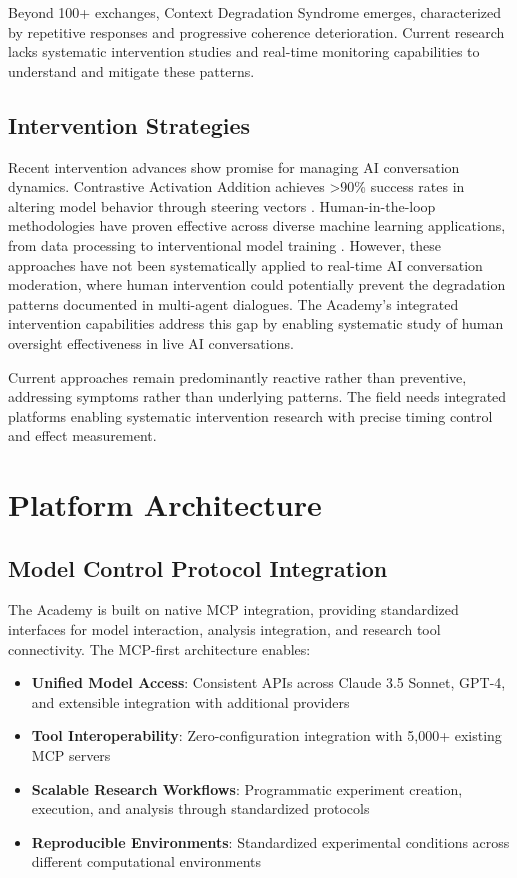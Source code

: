 \documentclass[11pt,letterpaper]{article}
\newcommand{\theacademy}{The Academy}
\newcommand{\mcp}{MCP}
\begin{document}
Beyond 100+ exchanges, Context Degradation Syndrome emerges, characterized by repetitive responses and progressive coherence deterioration. Current research lacks systematic intervention studies and real-time monitoring capabilities to understand and mitigate these patterns.

\subsection{Intervention Strategies}

Recent intervention advances show promise for managing AI conversation dynamics. Contrastive Activation Addition achieves >90\% success rates in altering model behavior through steering vectors \citep{panickssery2024activation}. Human-in-the-loop methodologies have proven effective across diverse machine learning applications, from data processing to interventional model training \citep{wu2022survey}. However, these approaches have not been systematically applied to real-time AI conversation moderation, where human intervention could potentially prevent the degradation patterns documented in multi-agent dialogues. \theacademy{}'s integrated intervention capabilities address this gap by enabling systematic study of human oversight effectiveness in live AI conversations.

Current approaches remain predominantly reactive rather than preventive, addressing symptoms rather than underlying patterns. The field needs integrated platforms enabling systematic intervention research with precise timing control and effect measurement.

\section{Platform Architecture}

\subsection{Model Control Protocol Integration}

\theacademy{} is built on native \mcp{} integration, providing standardized interfaces for model interaction, analysis integration, and research tool connectivity. The \mcp{}-first architecture enables:

\begin{itemize}
    \item \textbf{Unified Model Access}: Consistent APIs across Claude 3.5 Sonnet, GPT-4, and extensible integration with additional providers
    \item \textbf{Tool Interoperability}: Zero-configuration integration with 5,000+ existing \mcp{} servers
    \item \textbf{Scalable Research Workflows}: Programmatic experiment creation, execution, and analysis through standardized protocols
    \item \textbf{Reproducible Environments}: Standardized experimental conditions across different computational environments
\end{itemize}
\end{document}
